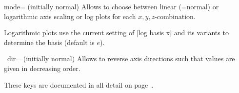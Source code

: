 \begin{pgfplotsxykey}{\x mode= (initially normal)}
    Allows to choose between linear (=normal) or logarithmic axis scaling or
    log plots for each $x,y,z$-combination.

    Logarithmic plots use the current setting of |log basis x| and its variants
    to determine the basis (default is $e$).
\end{pgfplotsxykey}

{\def\pgfmanualpdflabel#1#2{}
\begin{pgfplotsxykey}{\x\ dir= (initially normal)}
    Allows to reverse axis directions such that values are given in decreasing
    order.

    These keys are documented in all detail on page~\pageref{key:pgfplots:xydir}.
\end{pgfplotsxykey}
}

